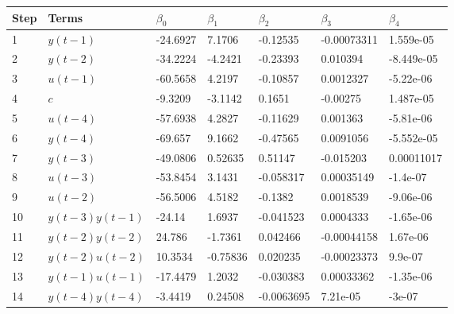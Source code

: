 \begin{tabular}{lllllll}
Step & Terms & $\beta_{0}$ & $\beta_{1}$ & $\beta_{2}$ & $\beta_{3}$ & $\beta_{4}$ \\ 
\hline 
1 & $y(t-1)$ & -24.6927 & 7.1706 & -0.12535 & -0.00073311 & 1.559e-05 \\ 
2 & $y(t-2)$ & -34.2224 & -4.2421 & -0.23393 & 0.010394 & -8.449e-05 \\ 
3 & $u(t-1)$ & -60.5658 & 4.2197 & -0.10857 & 0.0012327 & -5.22e-06 \\ 
4 & $c$ & -9.3209 & -3.1142 & 0.1651 & -0.00275 & 1.487e-05 \\ 
5 & $u(t-4)$ & -57.6938 & 4.2827 & -0.11629 & 0.001363 & -5.81e-06 \\ 
6 & $y(t-4)$ & -69.657 & 9.1662 & -0.47565 & 0.0091056 & -5.552e-05 \\ 
7 & $y(t-3)$ & -49.0806 & 0.52635 & 0.51147 & -0.015203 & 0.00011017 \\ 
8 & $u(t-3)$ & -53.8454 & 3.1431 & -0.058317 & 0.00035149 & -1.4e-07 \\ 
9 & $u(t-2)$ & -56.5006 & 4.5182 & -0.1382 & 0.0018539 & -9.06e-06 \\ 
10 & $y(t-3)y(t-1)$ & -24.14 & 1.6937 & -0.041523 & 0.0004333 & -1.65e-06 \\ 
11 & $y(t-2)y(t-2)$ & 24.786 & -1.7361 & 0.042466 & -0.00044158 & 1.67e-06 \\ 
12 & $y(t-2)u(t-2)$ & 10.3534 & -0.75836 & 0.020235 & -0.00023373 & 9.9e-07 \\ 
13 & $y(t-1)u(t-1)$ & -17.4479 & 1.2032 & -0.030383 & 0.00033362 & -1.35e-06 \\ 
14 & $y(t-4)y(t-4)$ & -3.4419 & 0.24508 & -0.0063695 & 7.21e-05 & -3e-07 \\ 
\hline 
\end{tabular}